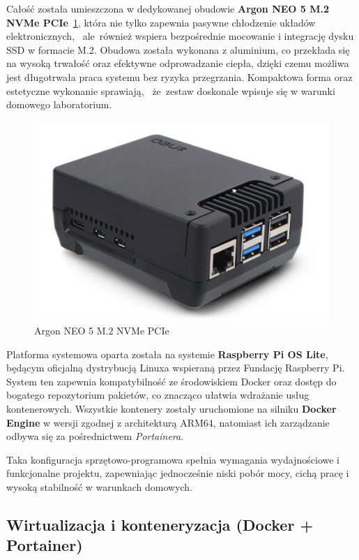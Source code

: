 \documentclass[
    left=2.5cm,         %
    right=2.5cm,        %
    top=2.5cm,          %
    bottom=3cm,         %
    bindingoffset=6mm,  %
    nohyphenation=true %
]{eiti/eiti-thesis} %
\begin{document}
Całość została umieszczona w dedykowanej obudowie \textbf{Argon NEO 5 M.2 NVMe PCIe}~\ref{fig:argon-neo}, która nie tylko zapewnia pasywne chłodzenie układów elektronicznych, ~ale~również wspiera bezpośrednie mocowanie i integrację dysku SSD w formacie M.2. Obudowa została wykonana z aluminium, co przekłada się na wysoką trwałość oraz efektywne odprowadzanie ciepła, dzięki czemu możliwa jest długotrwała praca systemu bez ryzyka przegrzania. Kompaktowa forma oraz estetyczne wykonanie sprawiają, ~że~zestaw doskonale wpisuje się w warunki domowego laboratorium.

\begin{figure}[H]
    \centering
    \includegraphics[width=\textwidth]{img/argon_neo.png}
    \caption{Argon NEO 5 M.2 NVMe PCIe}
    \label{fig:argon-neo}
\end{figure}

Platforma systemowa oparta została na systemie \textbf{Raspberry Pi OS Lite}\cite{raspberry-os}, będącym oficjalną dystrybucją Linuxa wspieraną przez Fundację Raspberry Pi. System ten zapewnia kompatybilność ze środowiskiem Docker oraz dostęp do bogatego repozytorium pakietów, co znacząco ułatwia wdrażanie usług kontenerowych. Wszystkie kontenery zostały uruchomione na silniku \textbf{Docker Engine} w wersji zgodnej z architekturą ARM64, natomiast ich zarządzanie odbywa 
się za pośrednictwem \textit{Portainera}\cite{portainer-docs}.

Taka konfiguracja sprzętowo-programowa spełnia wymagania wydajnościowe i funkcjonalne projektu, zapewniając jednocześnie niski pobór mocy, cichą pracę i wysoką stabilność w warunkach domowych.

\subsection{Wirtualizacja i konteneryzacja (Docker + Portainer)}
\end{document}
